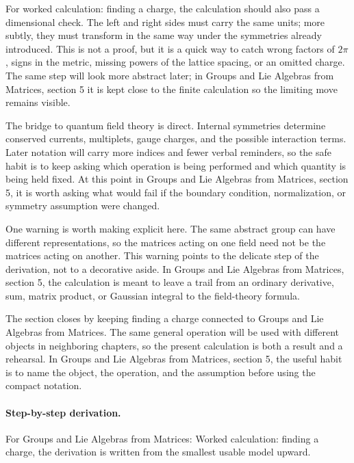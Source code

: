 For worked calculation: finding a charge, the calculation should also pass a dimensional check.  The left and right sides must carry the same units; more subtly, they must transform in the same way under the symmetries already introduced.  This is not a proof, but it is a quick way to catch wrong factors of \(2\pi\), signs in the metric, missing powers of the lattice spacing, or an omitted charge.  The same step will look more abstract later; in Groups and Lie Algebras from Matrices, section 5 it is kept close to the finite calculation so the limiting move remains visible.

The bridge to quantum field theory is direct.  Internal symmetries determine conserved currents, multiplets, gauge charges, and the possible interaction terms.  Later notation will carry more indices and fewer verbal reminders, so the safe habit is to keep asking which operation is being performed and which quantity is being held fixed.  At this point in Groups and Lie Algebras from Matrices, section 5, it is worth asking what would fail if the boundary condition, normalization, or symmetry assumption were changed.

One warning is worth making explicit here.  The same abstract group can have different representations, so the matrices acting on one field need not be the matrices acting on another.  This warning points to the delicate step of the derivation, not to a decorative aside.  In Groups and Lie Algebras from Matrices, section 5, the calculation is meant to leave a trail from an ordinary derivative, sum, matrix product, or Gaussian integral to the field-theory formula.

The section closes by keeping finding a charge connected to Groups and Lie Algebras from Matrices.  The same general operation will be used with different objects in neighboring chapters, so the present calculation is both a result and a rehearsal.  In Groups and Lie Algebras from Matrices, section 5, the useful habit is to name the object, the operation, and the assumption before using the compact notation.



\paragraph{Step-by-step derivation.}

For Groups and Lie Algebras from Matrices: Worked calculation: finding a charge, the derivation is written from the smallest usable model upward.

